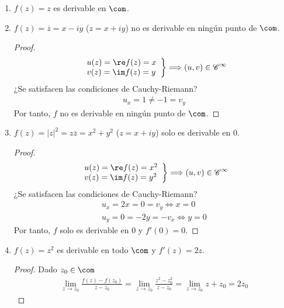 \begin{ejemplo}
\begin{enumerate}
    \item $f(z) = z$ es derivable en $\com$.
    \item $f(z) = \overline{z} = x -iy$ ($z = x+iy$) no es derivable en ningún punto de $\com$.
    \begin{proof}
    \begin{align*}
        \left. \begin{array}{lcc}
            u(z) = \re f(z) = x \\
            v(z) = \im f(z) = y\\
             \end{array}
        \right\} \Longrightarrow (u,v) \in \mathscr{C}^{\infty}
    \end{align*}
    ¿Se satisfacen las condiciones de Cauchy-Riemann?
    \begin{align*}
        u_x = 1 \not = -1 = v_y 
    \end{align*}
    Por tanto, $f$ no es derivable en ningún punto de $\com$.
    \end{proof}
    \item $f(z) = |z|^2 = z \overline{z} = x^2 + y^2$ ($z = x + iy$) solo es derivable en $0$.
    \begin{proof}
    \begin{align*}
        \left. \begin{array}{lcc}
            u(z) = \re f(z) = x^2 \\
            v(z) = \im f(z) = y^2\\
             \end{array}
        \right\} \Longrightarrow (u,v) \in \mathscr{C}^{\infty}
    \end{align*}
    ¿Se satisfacen las condiciones de Cauchy-Riemann?
    \begin{align*}
        u_x = 2x = 0 = v_y \Longleftrightarrow x = 0\\
        u_y = 0 = -2y = -v_x \Longleftrightarrow y = 0
    \end{align*}
    Por tanto, $f$ solo es derivable en $0$ y $f'(0) = 0$.
    \end{proof}
    \item $f(z) = z^2$ es derivable en todo $\com$ y $f'(z) = 2z$.
    \begin{proof}
    Dado $z_0 \in \com$
    \begin{align*}
        \lim_{z \to z_0}{\frac{f(z) - f(z_0)}{z - z_0}} = \lim_{z \to z_0}{\frac{z^2 - z_0^2}{z - z_0}} = \lim_{z \to z_0}{z + z_0} = 2z_0

\end{align*}
\end{proof}
\end{enumerate}
\end{ejemplo}
